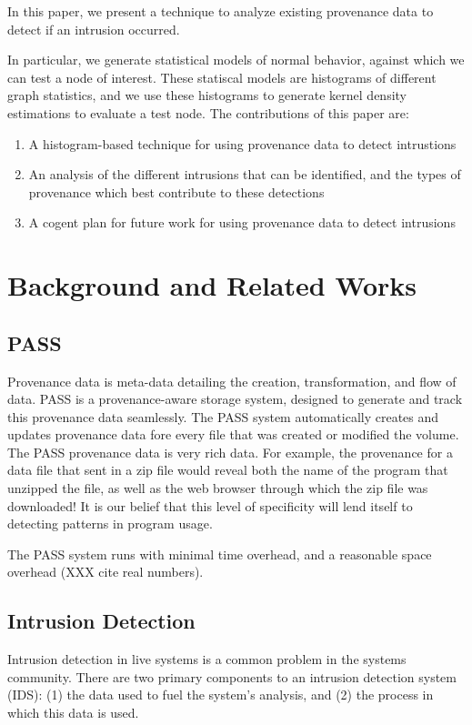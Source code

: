 \documentclass[10pt,twocolumn]{article}
\begin{document}
In this paper, we present a technique to analyze existing provenance data to detect if an intrusion occurred. 

In particular, we generate statistical models of normal behavior, against which we can test a node of interest. These statiscal models are histograms of different graph statistics, and we use these histograms to generate kernel density estimations to evaluate a test node. The contributions of this paper are:
\begin{enumerate}
\item A histogram-based technique for using provenance data to detect intrustions
\item An analysis of the different intrusions that can be identified, and the types of provenance which best contribute to these detections
\item A cogent plan for future work for using provenance data to detect intrusions
\end{enumerate}

\section{Background and Related Works}
\subsection{PASS}
Provenance data is meta-data detailing the creation, transformation, and flow of data. PASS \cite{pass, passv2} is a provenance-aware storage system, designed to generate and track this provenance data seamlessly. The PASS system automatically creates and updates provenance data fore every file that was created or modified the volume. The PASS provenance data is very rich data. For example, the provenance for a data file that sent in a zip file would reveal both the name of the program that unzipped the file, as well as the web browser through which the zip file was downloaded! It is our belief that this level of specificity will lend itself to detecting patterns in program usage.

The PASS system runs with minimal time overhead, and a reasonable space overhead (XXX cite real numbers).
\subsection{Intrusion Detection}
Intrusion detection in live systems is a common problem in the systems community. There are two primary components to an intrusion detection system (IDS): (1) the data used to fuel the system's analysis, and (2) the process in which this data is used.
\end{document}
